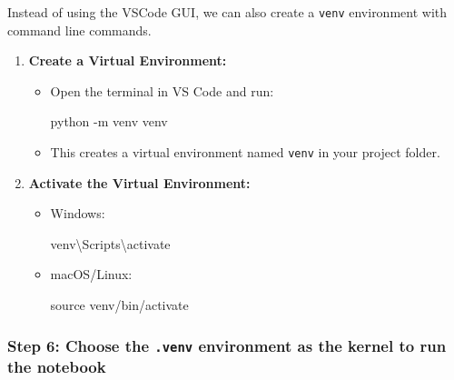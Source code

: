 \documentclass[
  letterpaper,
  DIV=11,
  numbers=noendperiod]{scrreprt}
\newenvironment{Shaded}{\begin{snugshade}}{\end{snugshade}}
\newcommand{\AttributeTok}[1]{\textcolor[rgb]{0.40,0.45,0.13}{#1}}
\newcommand{\BuiltInTok}[1]{\textcolor[rgb]{0.00,0.23,0.31}{#1}}
\newcommand{\ExtensionTok}[1]{\textcolor[rgb]{0.00,0.23,0.31}{#1}}
\newcommand{\NormalTok}[1]{\textcolor[rgb]{0.00,0.23,0.31}{#1}}
\providecommand{\tightlist}{%
  \setlength{\itemsep}{0pt}\setlength{\parskip}{0pt}}\usepackage{longtable,booktabs,array}
\begin{document}
Instead of using the VSCode GUI, we can also create a \texttt{venv}
environment with command line commands.

\begin{enumerate}
\def\labelenumi{\arabic{enumi}.}
\tightlist
\item
  \textbf{Create a Virtual Environment:}

  \begin{itemize}
  \item
    Open the terminal in VS Code and run:

\begin{Shaded}
\begin{Highlighting}[]
\ExtensionTok{python} \AttributeTok{{-}m}\NormalTok{ venv venv}
\end{Highlighting}
\end{Shaded}
  \item
    This creates a virtual environment named \texttt{venv} in your
    project folder.
  \end{itemize}
\item
  \textbf{Activate the Virtual Environment:}

  \begin{itemize}
  \item
    Windows:

\begin{Shaded}
\begin{Highlighting}[]
\ExtensionTok{venv\textbackslash{}Scripts\textbackslash{}activate}
\end{Highlighting}
\end{Shaded}
  \item
    macOS/Linux:

\begin{Shaded}
\begin{Highlighting}[]
\BuiltInTok{source}\NormalTok{ venv/bin/activate}
\end{Highlighting}
\end{Shaded}
  \end{itemize}
\end{enumerate}

\hypertarget{step-6-choose-the-.venv-environment-as-the-kernel-to-run-the-notebook}{%
\subsubsection{\texorpdfstring{Step 6: Choose the \texttt{.venv}
environment as the kernel to run the
notebook}{Step 6: Choose the .venv environment as the kernel to run the notebook}}\label{step-6-choose-the-.venv-environment-as-the-kernel-to-run-the-notebook}}
\end{document}
